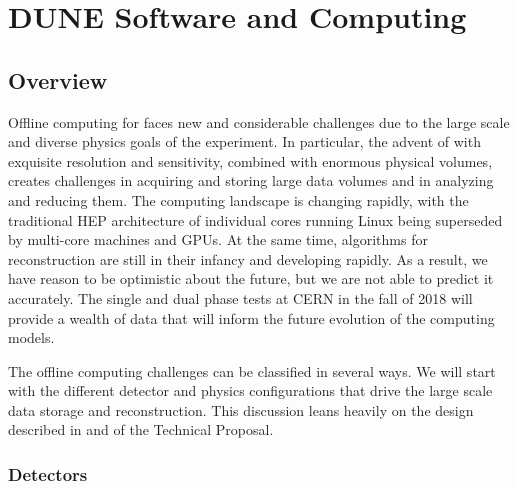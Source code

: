 %
\chapter{DUNE Software and Computing }


\section{Overview}

Offline computing for   faces new and considerable challenges due to the large scale and diverse physics goals of the experiment.  In particular, the advent of   with exquisite resolution and sensitivity, combined with enormous physical volumes, creates challenges in acquiring and storing large data volumes and in analyzing and reducing them.  The computing landscape is changing rapidly, with the traditional HEP architecture of individual cores running Linux being superseded by multi-core machines and GPUs. At the same time, algorithms for  reconstruction are still in their infancy and developing rapidly.  As a result, we have reason to be optimistic about the future, but we are not able to predict it accurately.  The  single and dual phase tests at CERN in the fall of 2018 will provide a wealth of data that will inform the future evolution of  the  computing models.

The   offline computing challenges can be classified in several ways.  We will start with the different detector and physics configurations that drive the large scale data storage and reconstruction. 
This discussion leans heavily on the  design described in \voltitlespfd and \voltitledpfd  of the  Technical Proposal. 

\subsection{Detectors}


